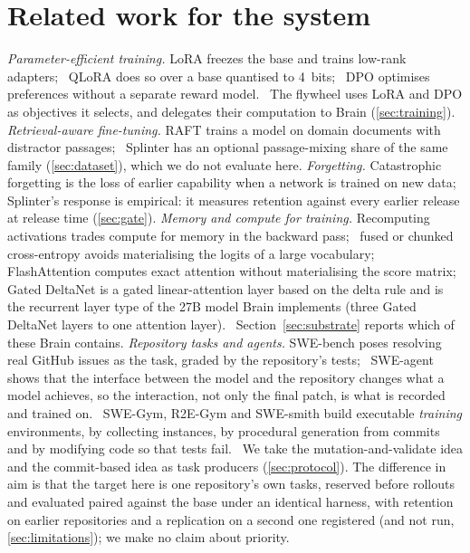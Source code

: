 
\section{Related work for the system}\label{app:related-system}

\emph{Parameter-efficient training.} LoRA freezes the base and trains low-rank
adapters;~\citep{lora2021} QLoRA does so over a base quantised to 4~bits;~\citep{qlora2023} DPO optimises
preferences without a separate reward model.~\citep{dpo2023} The flywheel uses LoRA and DPO as
objectives it selects, and delegates their computation to Brain (\cref{sec:training}).
\emph{Retrieval-aware fine-tuning.} RAFT trains a model on domain documents with
distractor passages;~\citep{raft2024} Splinter has an optional passage-mixing share of the same
family (\cref{sec:dataset}), which we do not evaluate here.
\emph{Forgetting.} Catastrophic forgetting is the loss of earlier capability when a
network is trained on new data;~\citep{ewc2016} Splinter's response is empirical: it measures
retention against every earlier release at release time (\cref{sec:gate}).
\emph{Memory and compute for training.} Recomputing activations trades compute for memory
in the backward pass;~\citep{recompute2016} fused or chunked cross-entropy avoids materialising the
logits of a large vocabulary;~\citep{cutxent2024} FlashAttention computes exact attention without
materialising the score matrix;~\citep{flashattention2022} Gated DeltaNet is a gated linear-attention layer based on the delta rule
and is the recurrent layer type of the 27B model Brain implements (three Gated DeltaNet
layers to one attention layer).~\citep{gateddelta2024} Section~\ref{sec:substrate}
reports which of these Brain contains.
\emph{Repository tasks and agents.} SWE-bench poses resolving real GitHub issues as the task,
graded by the repository's tests;~\citep{swebench2023} SWE-agent shows that the
interface between the model and the repository changes what a model achieves, so the interaction,
not only the final patch, is what is recorded and trained on.~\citep{sweagent2024}
SWE-Gym, R2E-Gym and SWE-smith build executable \emph{training} environments, by collecting
instances, by procedural generation from commits and by modifying code so that tests
fail.~\citep{swegym2024,r2egym2025,swesmith2025} We take the mutation-and-validate
idea and the commit-based idea as task producers (\cref{sec:protocol}). The difference
in aim is that the target here is one repository's own tasks, reserved before rollouts and
evaluated paired against the base under an identical harness, with retention on earlier
repositories and a replication on a second one registered (and not run, \cref{sec:limitations}); we make no claim about priority.
